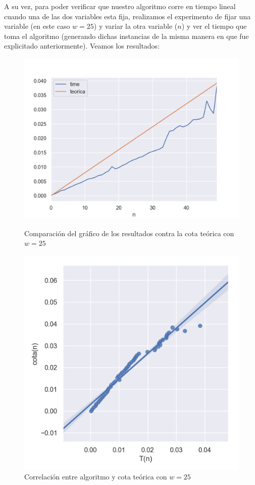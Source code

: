 A su vez, para poder verificar que nuestro algoritmo corre en tiempo lineal cuando una de las dos variables esta fija, realizamos el experimento de fijar una variable (en este caso $w=25$) y variar la otra variable ($n$) y ver el tiempo que toma el algoritmo (generando dichas instancias de la misma manera en que fue explicitado anteriormente). Veamos los resultados:

\begin{figure}[H]
   \begin{minipage}{0.5\textwidth}
     \centering
     \includegraphics[width=1\linewidth]{img/fijo_w_1}
     \caption{Comparación del gráfico de los resultados contra la cota teórica con $w=25$}
   \end{minipage}\hfill
   \begin{minipage}{0.5\textwidth}
     \centering
     \includegraphics[width=1\linewidth]{img/fijo_w_2}
     \caption{Correlación entre algoritmo y cota teórica con $w=25$}
   \end{minipage}
\end{figure}


